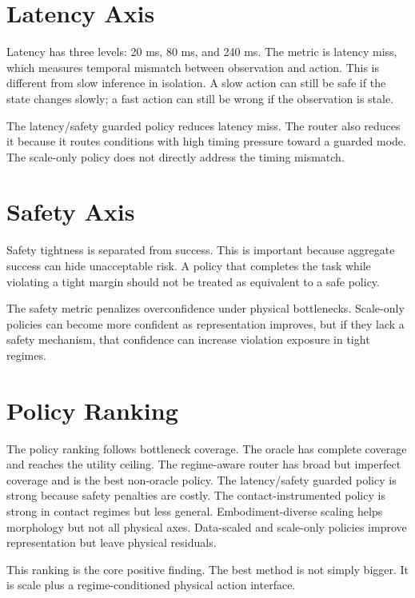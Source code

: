 \section{Latency Axis}

Latency has three levels: 20 ms, 80 ms, and 240 ms. The metric is latency miss, which measures temporal mismatch between observation and action. This is different from slow inference in isolation. A slow action can still be safe if the state changes slowly; a fast action can still be wrong if the observation is stale.

The latency/safety guarded policy reduces latency miss. The router also reduces it because it routes conditions with high timing pressure toward a guarded mode. The scale-only policy does not directly address the timing mismatch.

\section{Safety Axis}

Safety tightness is separated from success. This is important because aggregate success can hide unacceptable risk. A policy that completes the task while violating a tight margin should not be treated as equivalent to a safe policy.

The safety metric penalizes overconfidence under physical bottlenecks. Scale-only policies can become more confident as representation improves, but if they lack a safety mechanism, that confidence can increase violation exposure in tight regimes.

\section{Policy Ranking}

The policy ranking follows bottleneck coverage. The oracle has complete coverage and reaches the utility ceiling. The regime-aware router has broad but imperfect coverage and is the best non-oracle policy. The latency/safety guarded policy is strong because safety penalties are costly. The contact-instrumented policy is strong in contact regimes but less general. Embodiment-diverse scaling helps morphology but not all physical axes. Data-scaled and scale-only policies improve representation but leave physical residuals.

This ranking is the core positive finding. The best method is not simply bigger. It is scale plus a regime-conditioned physical action interface.

